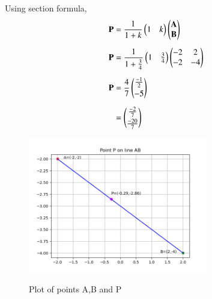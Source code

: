\documentclass[journal]{IEEEtran}
\begin{document}
Using section formula, 
\begin{align}
	\mathbf{P}&=\frac{1}{1 + k}\begin{pmatrix}1 & k\end{pmatrix}\begin{pmatrix}\mathbf{A}\\\mathbf{B}\end{pmatrix}\\[5pt]
	\mathbf{P}&=\frac{1}{1+\frac{3}{4}}\begin{pmatrix}1 & \frac{3}{4}\end{pmatrix}\begin{pmatrix}-2 & 2\\-2 & -4\end{pmatrix}\\[5pt]
	\mathbf{P}&=\frac{4}{7}\begin{pmatrix}\frac{-1}{2} \\[2 pt] -5\end{pmatrix}\\[5pt]
	&=\begin{pmatrix}\frac{-2}{7} \\[2pt] \frac{-20}{7}\end{pmatrix}
\end{align}
	\newpage
	\begin{figure}[h!]    
	  \begin{center}
		\includegraphics[width=0.7\textwidth]{Figs/Fig.png}
		\label{Graph}
		  \caption{Plot of points A,B and P}  
	 \end{center}	  
	\end{figure}
\end{document}
